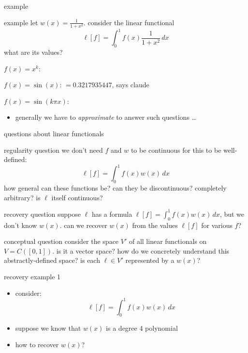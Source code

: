 \documentclass[10pt,
               svgnames,
               hyperref={colorlinks,citecolor=DeepPink4,linkcolor=FireBrick,urlcolor=Maroon},
               usepdftitle=false]{beamer}
\newcommand{\ds}{\displaystyle}
\begin{document}
\begin{frame}{example}

\begin{block}{example}
let $\ds w(x) = \frac{1}{1+x^2}$.  consider the linear functional
	$$\ell[f] = \int_0^1 f(x) \frac{1}{1+x^2}\,dx$$
what are its values?
\end{block}

\bigskip
\noindent $f(x) = x^k$:

\bigskip
\noindent $f(x) = \sin(x)$: \hfill {\footnotesize $=0.3217935447$, says claude}

\bigskip
\noindent $f(x) = \sin(k\pi x)$:

\vspace{10mm}

\begin{itemize}
\item generally we have to \emph{approximate} to answer such questions \dots
\end{itemize}
\end{frame}


\begin{frame}{questions about linear functionals}

\begin{block}{regularity question}
we don't need $f$ and $w$ to be continuous for this to be well-defined:
	$$\ell[f] = \int_0^1 f(x) w(x)\,dx$$
how general can these functions be?  can they be discontinuous?  completely arbitrary?  is $\ell$ itself continuous?
\end{block}

\begin{block}{recovery question}
suppose $\ell$ has a formula $\ell[f] = \int_0^1 f(x) w(x)\,dx$, but we don't know $w(x)$.  can we recover $w(x)$ from the values $\ell[f]$ for various $f$?
\end{block}

\begin{block}{conceptual question}
consider the space $V'$ of all linear functionals on $V=C([0,1])$.  is it a vector space?  how do we concretely understand this abstractly-defined space?  is each $\ell \in V'$ represented by a $w(x)$?
\end{block}
\end{frame}


\begin{frame}{recovery example 1}

\begin{itemize}
\item consider:
	$$\ell[f] = \int_0^1 f(x) w(x)\,dx$$
\item suppose we know that $w(x)$ is a degree 4 polynomial
\item how to recover $w(x)$?

\vspace{60mm}
\end{itemize}
\end{frame}
\end{document}
